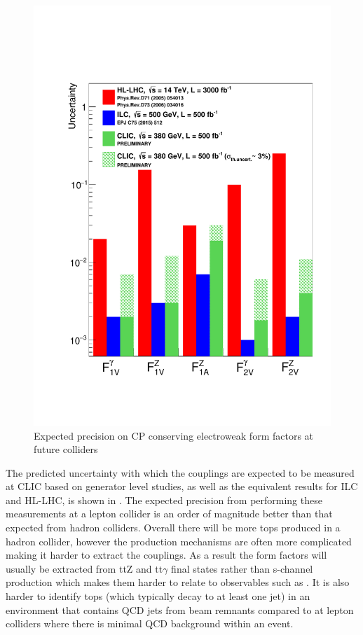 \begin{figure}
\centering
\includegraphics[width=0.65\linewidth]{Theory/fig/FormFactorsTopCLIC380.pdf}
\caption[Expected precision on CP conserving electroweak form factors at future colliders]{Expected precision on CP conserving electroweak form factors at future colliders \cite{CLIC:2016zwp}}
\label{fig:CPConserving}
\end{figure}

The predicted uncertainty with which the couplings are expected to be measured at \ac{CLIC} based on generator level studies, as well as the equivalent results for \ac{ILC} and \ac{HL-LHC}, is shown in . The expected precision from performing these measurements at a lepton collider is an order of magnitude better than that expected from hadron colliders. Overall there will be more tops produced in a hadron collider, however the production mechanisms are often more complicated making it harder to extract the couplings. As a result the form factors will usually be extracted from ttZ and tt$\gamma$ final states rather than s-channel production\cite{Baur:2005wi} which makes them harder to relate to observables such as \afb. It is also harder to identify tops (which typically decay to at least one jet) in an environment that contains \ac{QCD} jets from beam remnants compared to at lepton colliders where there is minimal \ac{QCD} background within an event.
